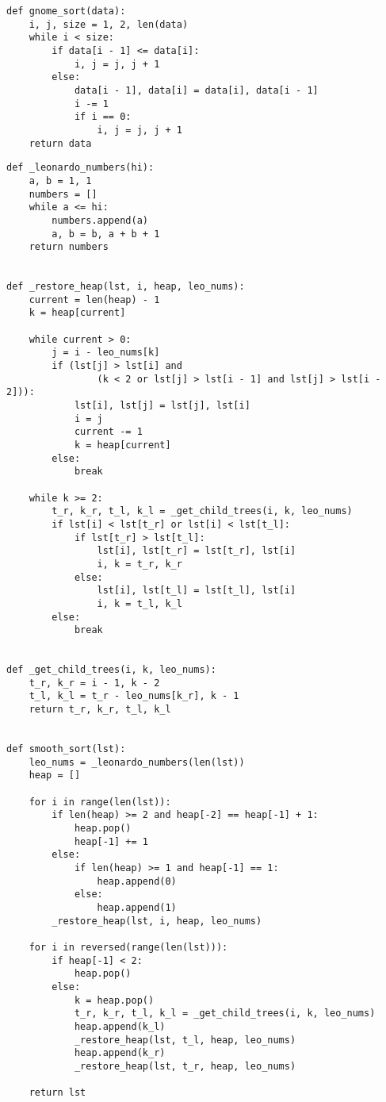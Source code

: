 \begin{lstlisting}[label=lst:heap,caption=Алгоритм гномьей сортировки]
def gnome_sort(data):
    i, j, size = 1, 2, len(data)
    while i < size:
        if data[i - 1] <= data[i]:
            i, j = j, j + 1
        else:
            data[i - 1], data[i] = data[i], data[i - 1]
            i -= 1
            if i == 0:
                i, j = j, j + 1
    return data
\end{lstlisting}

\begin{lstlisting}[label=lst:smooth,caption= Алгоритм плавной сортировки]
def _leonardo_numbers(hi):
    a, b = 1, 1
    numbers = []
    while a <= hi:
        numbers.append(a)
        a, b = b, a + b + 1
    return numbers


def _restore_heap(lst, i, heap, leo_nums):
    current = len(heap) - 1
    k = heap[current]

    while current > 0:
        j = i - leo_nums[k]
        if (lst[j] > lst[i] and
                (k < 2 or lst[j] > lst[i - 1] and lst[j] > lst[i - 2])):
            lst[i], lst[j] = lst[j], lst[i]
            i = j
            current -= 1
            k = heap[current]
        else:
            break

    while k >= 2:
        t_r, k_r, t_l, k_l = _get_child_trees(i, k, leo_nums)
        if lst[i] < lst[t_r] or lst[i] < lst[t_l]:
            if lst[t_r] > lst[t_l]:
                lst[i], lst[t_r] = lst[t_r], lst[i]
                i, k = t_r, k_r
            else:
                lst[i], lst[t_l] = lst[t_l], lst[i]
                i, k = t_l, k_l
        else:
            break


def _get_child_trees(i, k, leo_nums):
    t_r, k_r = i - 1, k - 2
    t_l, k_l = t_r - leo_nums[k_r], k - 1
    return t_r, k_r, t_l, k_l


def smooth_sort(lst):
    leo_nums = _leonardo_numbers(len(lst))
    heap = []

    for i in range(len(lst)):
        if len(heap) >= 2 and heap[-2] == heap[-1] + 1:
            heap.pop()
            heap[-1] += 1
        else:
            if len(heap) >= 1 and heap[-1] == 1:
                heap.append(0)
            else:
                heap.append(1)
        _restore_heap(lst, i, heap, leo_nums)

    for i in reversed(range(len(lst))):
        if heap[-1] < 2:
            heap.pop()
        else:
            k = heap.pop()
            t_r, k_r, t_l, k_l = _get_child_trees(i, k, leo_nums)
            heap.append(k_l)
            _restore_heap(lst, t_l, heap, leo_nums)
            heap.append(k_r)
            _restore_heap(lst, t_r, heap, leo_nums)

    return lst
\end{lstlisting}

